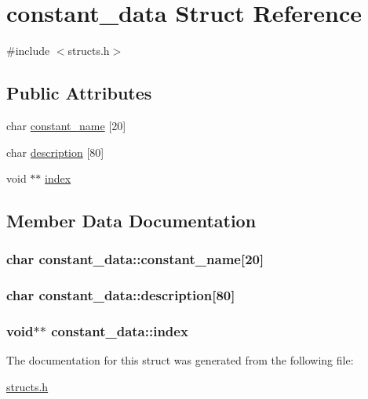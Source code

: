 \hypertarget{structconstant__data}{\section{constant\-\_\-data Struct Reference}
\label{structconstant__data}
}


{\ttfamily \#include $<$structs.\-h$>$}

\subsection*{Public Attributes}
\begin{DoxyCompactItemize}
\item 
char \hyperlink{structconstant__data_a1c8219b57ea2103001e9ef947dc74bdb}{constant\-\_\-name} \mbox{[}20\mbox{]}
\item 
char \hyperlink{structconstant__data_af3adb4820e6f56bf86d5344a783e1328}{description} \mbox{[}80\mbox{]}
\item 
void $\ast$$\ast$ \hyperlink{structconstant__data_aef93c64d3c1941d9077c0efa118851c0}{index}
\end{DoxyCompactItemize}


\subsection{Member Data Documentation}
\hypertarget{structconstant__data_a1c8219b57ea2103001e9ef947dc74bdb}{
\subsubsection[{constant\-\_\-name}]{\setlength{\rightskip}{0pt plus 5cm}char constant\-\_\-data\-::constant\-\_\-name\mbox{[}20\mbox{]}}}\label{structconstant__data_a1c8219b57ea2103001e9ef947dc74bdb}
\hypertarget{structconstant__data_af3adb4820e6f56bf86d5344a783e1328}{
\subsubsection[{description}]{\setlength{\rightskip}{0pt plus 5cm}char constant\-\_\-data\-::description\mbox{[}80\mbox{]}}}\label{structconstant__data_af3adb4820e6f56bf86d5344a783e1328}
\hypertarget{structconstant__data_aef93c64d3c1941d9077c0efa118851c0}{
\subsubsection[{index}]{\setlength{\rightskip}{0pt plus 5cm}void$\ast$$\ast$ constant\-\_\-data\-::index}}\label{structconstant__data_aef93c64d3c1941d9077c0efa118851c0}


The documentation for this struct was generated from the following file\-:\begin{DoxyCompactItemize}
\item 
\hyperlink{structs_8h}{structs.\-h}\end{DoxyCompactItemize}
